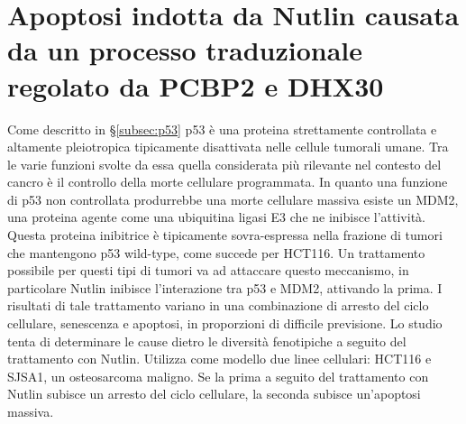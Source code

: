 \section{Apoptosi indotta da Nutlin causata da un processo traduzionale regolato da PCBP2 e DHX30}
Come descritto in \S\ref{subsec:p53} p53 \`e una proteina strettamente controllata e altamente pleiotropica tipicamente disattivata nelle cellule tumorali umane.
Tra le varie funzioni svolte da essa quella considerata pi\`u rilevante nel contesto del cancro \`e il controllo della morte cellulare programmata.
In quanto una funzione di p53 non controllata produrrebbe una morte cellulare massiva esiste un MDM2, una proteina agente come una ubiquitina ligasi E3 che ne inibisce l'attivit\`a.
Questa proteina inibitrice \`e tipicamente sovra-espressa nella frazione di tumori che mantengono p53 wild-type, come succede per HCT116.
Un trattamento possibile per questi tipi di tumori va ad attaccare questo meccanismo, in particolare Nutlin inibisce l'interazione tra p53 e MDM2, attivando la prima.
I risultati di tale trattamento variano in una combinazione di arresto del ciclo cellulare, senescenza e apoptosi, in proporzioni di difficile previsione.
Lo studio \cite{nutlin} tenta di determinare le cause dietro le diversit\`a fenotipiche a seguito del trattamento con Nutlin.
Utilizza come modello due linee cellulari: HCT116 e SJSA1, un osteosarcoma maligno.
Se la prima a seguito del trattamento con Nutlin subisce un arresto del ciclo cellulare, la seconda subisce un'apoptosi massiva.

